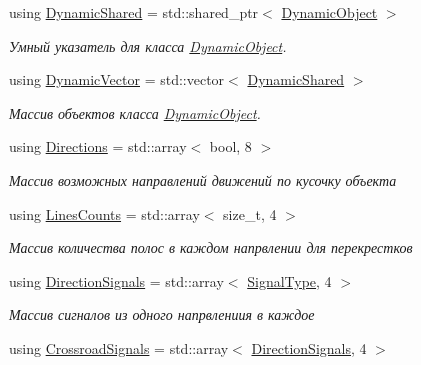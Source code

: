 \begin{DoxyCompactItemize}
\mbox{\label{namespacertm_af668a936c29b476890a79ad1eb19e3cc}} 
using \hyperlink{namespacertm_af668a936c29b476890a79ad1eb19e3cc}{Dynamic\+Shared} = std\+::shared\+\_\+ptr$<$ \hyperlink{classrtm_1_1_dynamic_object}{Dynamic\+Object} $>$
\begin{DoxyCompactList}\small\item\em Умный указатель для класса \hyperlink{classrtm_1_1_dynamic_object}{Dynamic\+Object}. \end{DoxyCompactList}\item 
\mbox{\label{namespacertm_a7fb21a6bf2f6f5947e2875093824c144}} 
using \hyperlink{namespacertm_a7fb21a6bf2f6f5947e2875093824c144}{Dynamic\+Vector} = std\+::vector$<$ \hyperlink{namespacertm_af668a936c29b476890a79ad1eb19e3cc}{Dynamic\+Shared} $>$
\begin{DoxyCompactList}\small\item\em Массив объектов класса \hyperlink{classrtm_1_1_dynamic_object}{Dynamic\+Object}. \end{DoxyCompactList}\item 
using \hyperlink{namespacertm_a4776fbfe59834ff1a16838ad6735b69a}{Directions} = std\+::array$<$ bool, 8 $>$
\begin{DoxyCompactList}\small\item\em Массив возможных направлений движений по кусочку объекта \end{DoxyCompactList}\item 
using \hyperlink{namespacertm_a14457f3088a92b86a96686b72d3e4eea}{Lines\+Counts} = std\+::array$<$ size\+\_\+t, 4 $>$
\begin{DoxyCompactList}\small\item\em Массив количества полос в каждом напрвлении для перекрестков \end{DoxyCompactList}\item 
using \hyperlink{namespacertm_a681634e130c2137fe63a658b0e0a5e46}{Direction\+Signals} = std\+::array$<$ \hyperlink{namespacertm_aadb7300c15d57429546fb0b7f8ee0ee6}{Signal\+Type}, 4 $>$
\begin{DoxyCompactList}\small\item\em Массив сигналов из одного напрвлениия в каждое \end{DoxyCompactList}\item 
using \hyperlink{namespacertm_afa6df86cef8e2ebcc053ad994e440354}{Crossroad\+Signals} = std\+::array$<$ \hyperlink{namespacertm_a681634e130c2137fe63a658b0e0a5e46}{Direction\+Signals}, 4 $>$

\end{DoxyCompactItemize}

